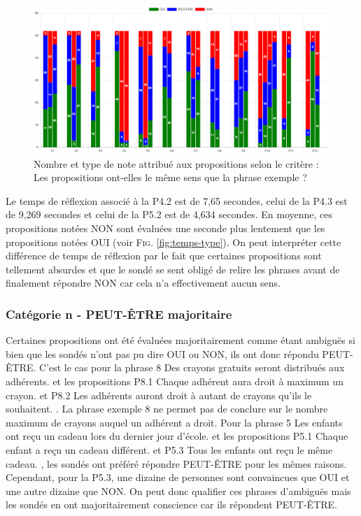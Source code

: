 \documentclass[11pt,letterpaper]{article}
\begin{document}
\vspace{3px}

\begin{figure}[htbp]
\begin{center}
\includegraphics[width=\textwidth]{figures/nb-prop.png}
\caption{Nombre et type de note attribué aux propositions selon le critère : \og Les propositions ont-elles le même sens que la phrase exemple ? \fg{}}
\label{fig:nb-prop}
\end{center}
\end{figure}

Le temps de réflexion associé à la P4.2 est de 7,65 secondes, celui de la P4.3 est de 9,269 secondes et celui de la P5.2 est de 4,634 secondes. En moyenne, ces propositions notées NON sont évaluées une seconde plus lentement que les propositions notées OUI (voir \textsc{Fig. }\ref{fig:temps-type}). On peut interpréter cette différence de temps de réflexion par le fait que certaines propositions sont tellement absurdes et que le sondé se sent obligé de relire les phrases avant de finalement répondre NON car cela n'a effectivement aucun sens.

\vspace{7px}

\subsubsection{Catégorie n - \og PEUT-ÊTRE \fg{} majoritaire}

Certaines propositions ont été évaluées majoritairement comme étant ambiguës si bien que les sondés n'ont pas pu dire OUI ou NON, ils ont donc répondu PEUT-ÊTRE. C'est le cas pour la phrase 8 \og Des crayons gratuits seront distribués aux adhérents. \fg{} et les propositions P8.1 \og Chaque adhérent aura droit à maximum un crayon. \fg{} et P8.2 \og Les adhérents auront droit à autant de crayons qu’ils le souhaitent. \fg{}. La phrase exemple 8 ne permet pas de conclure sur le nombre maximum de crayons auquel un adhérent a droit. Pour la phrase 5 \og Les enfants ont reçu un cadeau lors du dernier jour d’école. \fg{} et les propositions P5.1 \og Chaque enfant a reçu un cadeau différent. \fg{} et P5.3 \og Tous les enfants ont reçu le même cadeau. \fg{}, les sondés ont préféré répondre PEUT-ÊTRE pour les mêmes raisons. Cependant, pour la P5.3, une dizaine de personnes sont convaincues que OUI et une autre dizaine que NON. On peut donc qualifier ces phrases d'ambiguës mais les sondés en ont majoritairement conscience car ils répondent PEUT-ÊTRE.\\
\end{document}
